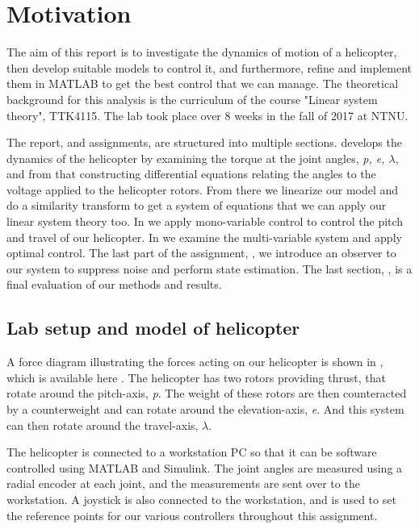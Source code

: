 \section{Motivation}\label{sec:intro}
The aim of this report is to investigate the dynamics of motion of a  helicopter, then develop suitable models to control it, and furthermore, refine and implement them in MATLAB to get the best control that we can manage. The theoretical background for this analysis is the  curriculum of the course "Linear system theory", TTK4115. The lab took place over 8 weeks in the fall of 2017 at NTNU.

The report, and assignments, are structured into multiple sections.  develops the dynamics of the helicopter by examining the torque at the joint angles, \textit{p, e, $\lambda$}, and from that constructing differential equations relating the angles to the voltage applied to the helicopter rotors. From there we linearize our model and do a similarity transform to get a system of equations that we can apply our linear system theory too. In  we apply mono-variable control to control the pitch and travel of our helicopter. In  we examine the multi-variable system and apply optimal control. The last part of the assignment, , we introduce an observer to our system to suppress noise and perform state estimation. The last section, , is a final evaluation of our methods and results.

\subsection{Lab setup and model of helicopter}
A force diagram illustrating the forces acting on our helicopter is shown in , which is available here \cite{github}. The helicopter has two rotors providing thrust, that rotate around the pitch-axis, \textit{p}. The weight of these rotors are then counteracted by a counterweight and can rotate around the elevation-axis, \textit{e}. And this system can then rotate around the travel-axis, $\lambda$.

The helicopter is connected to a workstation PC so that it can be software controlled using MATLAB and Simulink. The joint angles are measured using a radial encoder at each joint, and the measurements are sent over to the workstation. A joystick is also connected to the workstation, and is used to set the reference points for our various controllers throughout this assignment.

